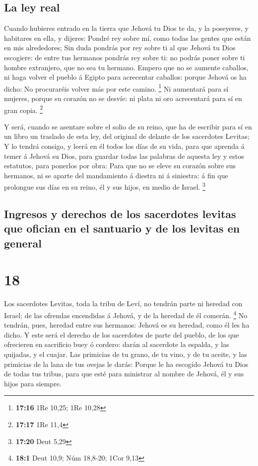 \hypertarget{la-ley-real}{%
\subsection{La ley real}\label{la-ley-real}}

 Cuando hubieres entrado en la tierra que Jehová tu Dios te
da, y la poseyeres, y habitares en ella, y dijeres: Pondré rey sobre mí,
como todas las gentes que están en mis alrededores;  Sin
duda pondrás por rey sobre ti al que Jehová tu Dios escogiere: de entre
tus hermanos pondrás rey sobre ti: no podrás poner sobre ti hombre
extranjero, que no sea tu hermano.  Empero que no se
aumente caballos, ni haga volver el pueblo á Egipto para acrecentar
caballos: porque Jehová os ha dicho: No procuraréis volver más por este
camino. \footnote{\textbf{17:16} 1Re 10,25; 1Re 10,28}  Ni
aumentará para sí mujeres, porque su corazón no se desvíe: ni plata ni
oro acrecentará para sí en gran copia. \footnote{\textbf{17:17} 1Re 11,4}

 Y será, cuando se asentare sobre el solio de su reino, que
ha de escribir para sí en un libro un traslado de esta ley, del original
de delante de los sacerdotes Levitas;  Y lo tendrá consigo,
y leerá en él todos los días de su vida, para que aprenda á temer á
Jehová su Dios, para guardar todas las palabras de aquesta ley y estos
estatutos, para ponerlos por obra:  Para que no se eleve su
corazón sobre sus hermanos, ni se aparte del mandamiento á diestra ni á
siniestra: á fin que prolongue sus días en su reino, él y sus hijos, en
medio de Israel. \footnote{\textbf{17:20} Deut 5,29}

\hypertarget{ingresos-y-derechos-de-los-sacerdotes-levitas-que-ofician-en-el-santuario-y-de-los-levitas-en-general}{%
\subsection{Ingresos y derechos de los sacerdotes levitas que ofician en
el santuario y de los levitas en
general}\label{ingresos-y-derechos-de-los-sacerdotes-levitas-que-ofician-en-el-santuario-y-de-los-levitas-en-general}}

\hypertarget{section-17}{%
\section{18}\label{section-17}}

 Los sacerdotes Levitas, toda la tribu de Leví, no tendrán
parte ni heredad con Israel; de las ofrendas encendidas á Jehová, y de
la heredad de él comerán. \footnote{\textbf{18:1} Deut 10,9; Núm
  18,8-20; 1Cor 9,13}  No tendrán, pues, heredad entre sus
hermanos: Jehová es su heredad, como él les ha dicho.  Y
este será el derecho de los sacerdotes de parte del pueblo, de los que
ofrecieren en sacrificio buey ó cordero: darán al sacerdote la espalda,
y las quijadas, y el cuajar.  Las primicias de tu grano, de
tu vino, y de tu aceite, y las primicias de la lana de tus ovejas le
darás:  Porque le ha escogido Jehová tu Dios de todas tus
tribus, para que esté para ministrar al nombre de Jehová, él y sus hijos
para siempre.

